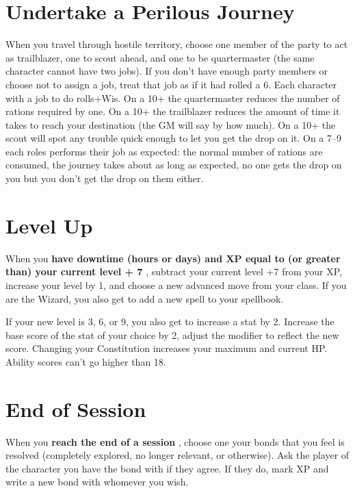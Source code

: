  
\section{Undertake a Perilous Journey}     
 

When you travel through hostile territory, choose one member of the party to act as trailblazer, one to scout ahead, and one to be quartermaster (the same character cannot have two jobs). If you don't have enough party members or choose not to assign a job, treat that job as if it had rolled a 6. Each character with a job to do rolls+Wis. On a 10+ the quartermaster reduces the number of rations required by one. On a 10+ the trailblazer reduces the amount of time it takes to reach your destination (the GM will say by how much). On a 10+ the scout will spot any trouble quick enough to let you get the drop on it. On a 7–9 each roles performs their job as expected: the normal number of rations are consumed, the journey takes about as long as expected, no one gets the drop on you but you don't get the drop on them either.

 
\section{Level Up}   
 

When you {\bf have downtime (hours or days) and XP equal to (or greater than) your current level + 7} , subtract your current level +7 from your XP, increase your level by 1, and choose a new advanced move from your class. If you are the Wizard, you also get to add a new spell to your spellbook.

 

If your new level is 3, 6, or 9, you also get to increase a stat by 2. Increase the base score of the stat of your choice by 2, adjust the modifier to reflect the new score. Changing your Constitution increases your maximum and current HP. Ability scores can't go higher than 18.

 
\section{End of Session}   
 

When you {\bf reach the end of a session} , choose one your bonds that you feel is resolved (completely explored, no longer relevant, or otherwise). Ask the player of the character you have the bond with if they agree. If they do, mark XP and write a new bond with whomever you wish.


